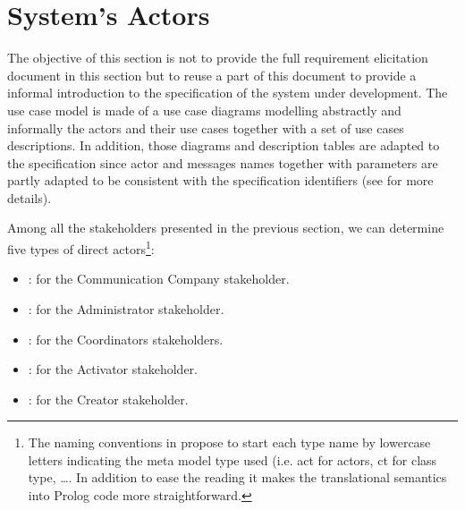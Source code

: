 \section{System's Actors}
\label{sec:icrash-gendescr-actors}

The objective of this section is not to provide the full requirement elicitation document in this section but to reuse a part of this document to provide a informal introduction to the \msrmessir specification of the system under development. The use case model is made of a use case diagrams modelling abstractly and informally the actors and their use cases together with a set of use cases descriptions. 
In addition, those diagrams and description tables are adapted to the \msrmessir specification since actor and messages names together with parameters are partly adapted to be consistent with the specification identifiers (see \cite{messirbook} for more details). 

Among all the stakeholders presented in the previous section, we can determine five types of \glspl{direct actor}\footnote{The naming conventions in \msrmessir propose to start each type name by lowercase letters indicating the meta model type used (i.e. act for actors, ct for class type, \ldots. In addition to ease the reading it makes the translational semantics into Prolog code more straightforward.}: 
\begin{itemize}
  \item {}: for the Communication Company stakeholder.
  \item {}: for the Administrator stakeholder.
  \item {}: for the Coordinators stakeholders.
  \item {}: for the Activator stakeholder.
  \item {}: for the Creator stakeholder.
\end{itemize}
 
